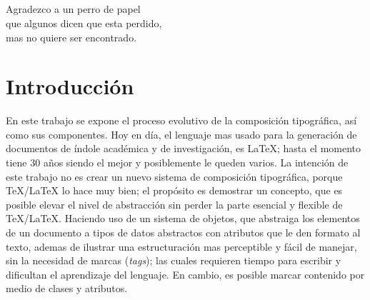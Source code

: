 \documentclass[12pt,letterpaper,titlepage,oneside,openright]{book}
\newcommand{\latex}{\LaTeX\xspace}
\newcommand{\tex}{\TeX\xspace}
\begin{document}
\newpage

\section*{} %
\begin{flushleft}
Agradezco a un perro de papel \\
que algunos dicen que esta perdido, \\
mas no quiere ser encontrado.
\end{flushleft}

\newpage

\tableofcontents

\mainmatter



 
 


\chapter{Introducción}

En este trabajo se expone el proceso evolutivo de la composición tipográfica, así como sus componentes. Hoy en día, el lenguaje mas usado para la generación de documentos de índole académica y de investigación, es \latex; hasta el momento tiene 30 años siendo el mejor y posiblemente le queden varios. La intención de este trabajo no es crear un nuevo sistema de composición tipográfica, porque \tex/\latex lo hace muy bien; el propósito es demostrar un concepto, que es posible elevar el nivel de abstracción sin perder la parte esencial y flexible de \tex/\latex. Haciendo uso de un sistema de objetos, que abstraiga los elementos de un documento a tipos de datos abstractos con atributos que le den formato al texto, ademas de ilustrar una estructuración mas perceptible y fácil de manejar, sin la necesidad de marcas (\textit{tags}); las cuales requieren tiempo para escribir y dificultan el aprendizaje del lenguaje. En cambio, es posible marcar contenido por medio de clases y atributos.
\end{document}
